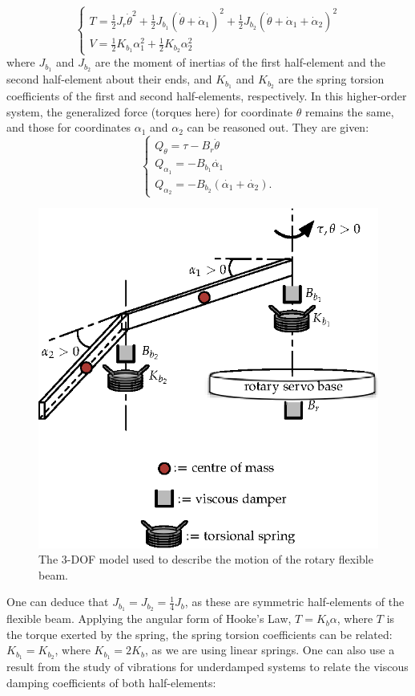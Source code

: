 \documentclass[12pt]{report}
\begin{document}
\[
    \begin{cases}
        T = \frac{1}{2} J_r \dot{\theta}^2 + \frac{1}{2} J_{b_1} \left(\dot{\theta} + \dot{\alpha}_1\right)^2 + \frac{1}{2} J_{b_2} \left(\dot{\theta} + \dot{\alpha}_1 + \dot{\alpha}_2\right)^2 \\
        V = \frac{1}{2} K_{b_1}\alpha_{1}^2 + \frac{1}{2} K_{b_2} \alpha_{2}^2
    \end{cases}
\]
where $J_{b_1}$ and $J_{b_2}$ are the moment of inertias of the first half-element and the second half-element about their ends, and $K_{b_1}$ and $K_{b_2}$ are the spring torsion coefficients of the first and second half-elements, respectively. In this higher-order system, the generalized force (torques here) for coordinate $\theta$ remains the same, and those for coordinates $\alpha_1$ and $\alpha_2$ can be reasoned out. They are given:
\[
    \begin{cases}
        Q_\theta = \tau - B_r \dot{\theta}     \\
        Q_{\alpha_1} = -B_{b_1} \dot{\alpha_1} \\
        Q_{\alpha_2} = -B_{b_2} \left(\dot{\alpha_1}+\dot{\alpha_2}\right).
    \end{cases}
\]
\begin{figure}[htb!]
    \centering
    \includegraphics[width=.5\linewidth]{eps/lab_1/rotary_flexible_beam_3DOF_breakdown_edit.eps}
    \caption{The 3-DOF model used to describe the motion of the rotary flexible beam.}
    \label{fig:lab1_rotary_flexible_beam_3DOF_breakdown}
\end{figure}
One can deduce that $J_{b_1} = J_{b_2} = \frac{1}{4} J_b$, as these are symmetric half-elements of the flexible beam. Applying the angular form of Hooke's Law, $T=K_b\alpha$, where $T$ is the torque exerted by the spring, the spring torsion coefficients can be related: $K_{b_1} = K_{b_2}$, where $K_{b_1} = 2 K_b$, as we are using linear springs. One can also use a result from the study of vibrations for underdamped systems to relate the viscous damping coefficients of both half-elements:
\end{document}
